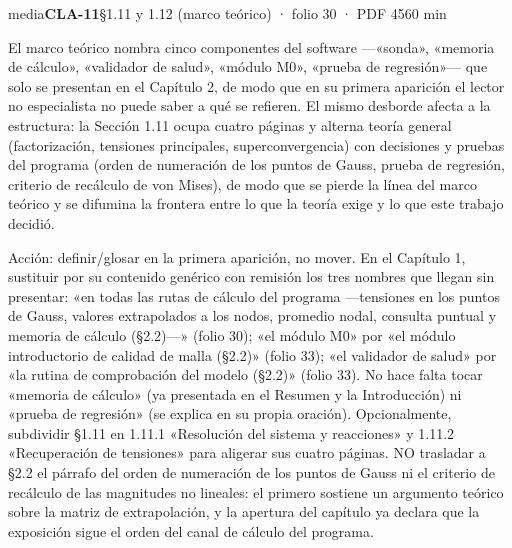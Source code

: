 \begin{ficha}{media}{\casilla\textbf{CLA-11}\quad{}\quad §1.11 y 1.12 (marco teórico) · folio 30 · PDF 45\hfill 60 min}
\par
{}El marco teórico nombra cinco componentes del software —«sonda», «memoria de cálculo», «validador de salud», «módulo M0», «prueba de regresión»— que solo se presentan en el Capítulo 2, de modo que en su primera aparición el lector no especialista no puede saber a qué se refieren. El mismo desborde afecta a la estructura: la Sección 1.11 ocupa cuatro páginas y alterna teoría general (factorización, tensiones principales, superconvergencia) con decisiones y pruebas del programa (orden de numeración de los puntos de Gauss, prueba de regresión, criterio de recálculo de von Mises), de modo que se pierde la línea del marco teórico y se difumina la frontera entre lo que la teoría exige y lo que este trabajo decidió.\par
{}Acción: definir/\allowbreak{}glosar en la primera aparición, no mover. En el Capítulo 1, sustituir por su contenido genérico con remisión los tres nombres que llegan sin presentar: «en todas las rutas de cálculo del programa —tensiones en los puntos de Gauss, valores extrapolados a los nodos, promedio nodal, consulta puntual y memoria de cálculo (§2.2)—» (folio 30); «el módulo M0» por «el módulo introductorio de calidad de malla (§2.2)» (folio 33); «el validador de salud» por «la rutina de comprobación del modelo (§2.2)» (folio 33). No hace falta tocar «memoria de cálculo» (ya presentada en el Resumen y la Introducción) ni «prueba de regresión» (se explica en su propia oración). Opcionalmente, subdividir §1.11 en 1.11.1 «Resolución del sistema y reacciones» y 1.11.2 «Recuperación de tensiones» para aligerar sus cuatro páginas. NO trasladar a §2.2 el párrafo del orden de numeración de los puntos de Gauss ni el criterio de recálculo de las magnitudes no lineales: el primero sostiene un argumento teórico sobre la matriz de extrapolación, y la apertura del capítulo ya declara que la exposición sigue el orden del canal de cálculo del programa.\par

\end{ficha}
